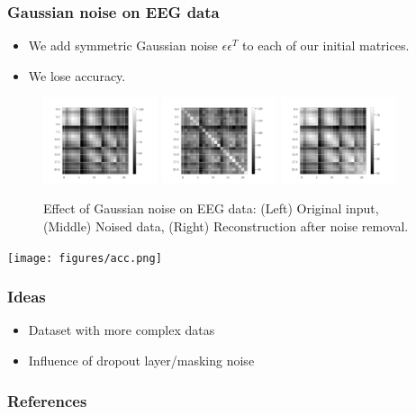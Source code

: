 \documentclass{beamer}
\begin{document}
\begin{frame}
    \frametitle{Gaussian noise on EEG data}
    \begin{itemize}
        \item We add symmetric Gaussian noise $\epsilon \epsilon^T$ to each of our initial matrices.
        \item We lose accuracy.
    \end{itemize}
    
    \begin{figure}
        \centering
        \includegraphics[width=0.3\textwidth]{figures/channel4_encoding_dim10_example_input_test.png}
        \includegraphics[width=0.3\textwidth]{figures/channel4_encoding_dim10_example_noised_test.png}
        \includegraphics[width=0.3\textwidth]{figures/channel4_encoding_dim10_example_reconstruction_test.png}
        \caption{Effect of Gaussian noise on EEG data: (Left) Original input, (Middle) Noised data, (Right) Reconstruction after noise removal.}
    \end{figure}
\end{frame}

\begin{frame}
    \begin{center}
        \texttt{[image: figures/acc.png]}
    \end{center}
\end{frame}

\begin{frame}
    \frametitle{Ideas}
    \begin{itemize}
        \item Dataset with more complex datas 
        \item Influence of dropout layer/masking noise
    \end{itemize}
\end{frame}

\begin{frame}[allowframebreaks]
    \frametitle{References}
    
    
\end{frame}


\end{document}
